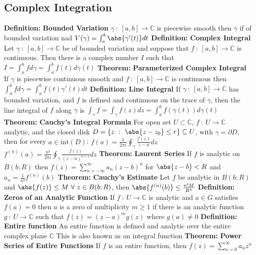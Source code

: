 \documentclass[14pt]{extarticle}
\def\Definition{{\color{blue} \textbf{Definition:} }}
\def\Theorem{{\color{red} \textbf{Theorem:} }}
\begin{document}
\begin{outline}
\section*{Complex Integration}
	\1	\Definition \textbf{Bounded Variation}
		\2	$\gamma~:~[a,b] \rightarrow \mathbb{C}$ is piecewise smooth then $\gamma$
				if of bounded variation nad $V(\gamma) = \int_a^b \abs{\gamma'(t)} dt$
	\1	\Definition \textbf{Complex Integral}
		\2	Let $\gamma~:~[a,b] \rightarrow \mathbb{C}$ be of bounded variation and
				suppose that $f~:~[a,b] \rightarrow \mathbb{C}$ is continuous.  Then 
				there is a complex number $I$ such that 
				$I = \int_a^b f d\gamma = \int_a^b f(t) d\gamma(t)$
	\1	\Theorem \textbf{Parameterized Complex Integral}
		\2	If $\gamma$ is piecewise continuous smooth and $f~:~[a,b] \rightarrow \mathbb{C}$
				is continuous then $\int_a^b f d\gamma = \int_a^b f(t) \gamma'(t) dt$
	\1	\Definition \textbf{Line Integral}
		\2	If $\gamma~:~[a,b] \rightarrow \mathbb{C}$ has bounded variation, 
				and $f$ is defined and continuous on the trace of $\gamma$, then the 
				line integral of $f$ along $\gamma$ is
				$\int_{\gamma} f = \int_{\gamma}f(z) dz = \int_a^bf(\gamma(t)) d\gamma(t)$
	\1	\Theorem \textbf{Cauchy's Integral Formula}
		\2	For open set $U \subset \mathbb{C}$, $f~:~U \rightarrow \mathbb{C}$ analytic,
				and the closed disk $D = \{z~:~\abs{z - z_0} \le r\} \subseteq U$, with
				$\gamma = \partial D$, then for every $a \in \text{int}(D)$:
		\2	$f(a) = \frac{1}{2 \pi i}\oint_{\gamma} \frac{f(z)}{z - a}dz$
		\2	$f^{(n)}(a) = \frac{n!}{2\pi i}\oint_{\gamma} \frac{f(z)}{(z - a)^{n+1}}dz$
	\1	\Theorem \textbf{Laurent Series}
		\2	If $f$ is analytic on $B(b;R)$ then $f(z) = \sum_{n=-\infty}^{\infty}a_n(z - b)^n$
				for $\abs{z - b} < R$ and $a_n = \frac{1}{n!}f^{(n)}(b)$
	\1	\Theorem \textbf{Cauchy's Estimate}
		\2	Let $f$ be analytic in $B(b;R)$ and $\abs{f(z)} \le M~\forall~z \in B(b;R)$,
				then $\abs{f^{(n)}(b)} \le \frac{n!M}{R^n}$
	\1	\Definition \textbf{Zeros of an Analytic Function}
		\2	If $f~:~U \rightarrow \mathbb{C}$ is analytic and $a \in G$ satisfies
				$f(a) = 0$ then $a$ is a zero of multiplicity $m \ge 1$ if there is
				an analytic function $g~:~U \rightarrow \mathbb{C}$ such that 
				$f(z) = (z - a)^mg(z)$ where $g(a) \ne 0$
	\1	\Definition \textbf{Entire function}
		\2	An entire function is defined and analytic over the entire complex plane
				$\mathbb{C}$
		\2	This is also known as an integral function
	\1	\Theorem \textbf{Power Series of Entire Functions}
		\2	If $f$ is an entire function, then $f(z) = \sum_{n=0}^{\infty} a_n z^n$

\end{outline}
\end{document}
